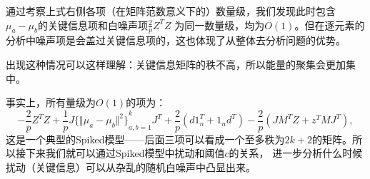 \documentclass[UTF8,12pt]{ctexart}
\begin{document}
通过考察上式右侧各项（在矩阵范数意义下的）数量级，我们发现此时包含$\mu_a-\mu_b$的关键信息项和白噪声项$\frac{2}{p}Z^T Z$
为同一数量级，均为$O(1)$。但在逐元素的分析中噪声项是会盖过关键信息项的，这也体现了从整体去分析问题的优势。

出现这种情况可以这样理解：关键信息矩阵的秩不高，所以能量的聚集会更加集中。

事实上，所有量级为$O(1)$的项为：
\[
    -\frac{2}{p}Z^T Z + \frac{1}{p}J{\{{\Vert \mu_a-\mu_b \Vert}^2\}}_{a,b=1}^k J^T + \frac{2}{p}(d 1_n^T + 1_n d^T)
    - \frac{2}{p}(J M^T Z + z^T M J^T),
\]  
这是一个典型的Spiked模型——后面三项可以看成一个至多秩为$2k+2$的矩阵。所以接下来我们就可以通过Spiked模型中扰动和阈值$c$的关系，
进一步分析什么时候扰动（关键信息）可以从杂乱的随机白噪声中凸显出来。



\end{document}
